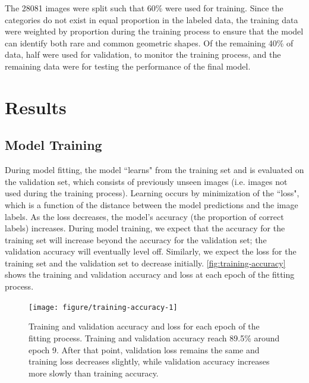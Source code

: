 \documentclass{article}\usepackage[]{graphicx}\usepackage[table]{xcolor}
\newenvironment{knitrout}{}{} %
\begin{document}
The 28081 images were split such that 60\% were used for training. Since the categories do not exist in equal proportion in the labeled data,
the training data were weighted by proportion during the training process to ensure that the model can identify both rare and common geometric shapes. Of the remaining 40\% of data, half were used for validation, to monitor the training process, and the remaining data were for testing the performance of the final model.

\section{Results}

\subsection{Model Training}
During model fitting, the model ``learns" from the training set and is evaluated on the validation set, which consists of previously unseen images (i.e. images not used during the training process). Learning occurs by minimization of the ``loss", which is a function of the distance between the model predictions and the image labels. As the loss decreases, the model's accuracy (the proportion of correct labels) increases. During model training, we expect that the accuracy for the training set will increase beyond the accuracy for the validation set; the validation accuracy will eventually level off. Similarly, we expect the loss for the training set and the validation set to decrease initially. \autoref{fig:training-accuracy} shows the training and validation accuracy and loss at each epoch of the fitting process.

\begin{knitrout}
\color{fgcolor}\begin{figure}[h]

{\centering \texttt{[image: figure/training-accuracy-1]} 

}

\caption[Training and validation accuracy and loss during each epoch.]{Training and validation accuracy and loss for each epoch of the fitting process. Training and validation accuracy reach 89.5\% around epoch 9. After that point, validation loss remains the same and training loss decreases slightly, while validation accuracy increases more slowly than training accuracy.}\label{fig:training-accuracy}
\end{figure}


\end{knitrout}
\end{document}
